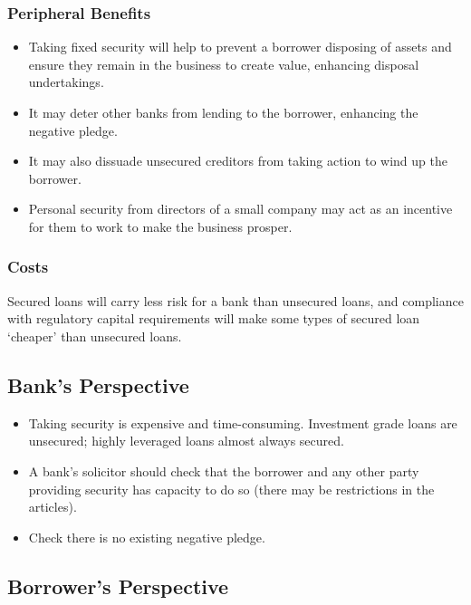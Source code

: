 \documentclass[
]{article}
\providecommand{\tightlist}{%
  \setlength{\itemsep}{0pt}\setlength{\parskip}{0pt}}
\begin{document}
\hypertarget{peripheral-benefits}{%
\subsubsection{Peripheral Benefits}\label{peripheral-benefits}}

\begin{itemize}
\tightlist
\item
  Taking fixed security will help to prevent a borrower disposing of
  assets and ensure they remain in the business to create value,
  enhancing disposal undertakings.
\item
  It may deter other banks from lending to the borrower, enhancing the
  negative pledge.
\item
  It may also dissuade unsecured creditors from taking action to wind up
  the borrower.
\item
  Personal security from directors of a small company may act as an
  incentive for them to work to make the business prosper.
\end{itemize}

\hypertarget{costs}{%
\subsubsection{Costs}\label{costs}}

Secured loans will carry less risk for a bank than unsecured loans, and
compliance with regulatory capital requirements will make some types of
secured loan `cheaper' than unsecured loans.

\hypertarget{banks-perspective}{%
\subsection{Bank's Perspective}\label{banks-perspective}}

\begin{itemize}
\tightlist
\item
  Taking security is expensive and time-consuming. Investment grade
  loans are unsecured; highly leveraged loans almost always secured.
\item
  A bank's solicitor should check that the borrower and any other party
  providing security has capacity to do so (there may be restrictions in
  the articles).
\item
  Check there is no existing negative pledge.
\end{itemize}

\hypertarget{borrowers-perspective}{%
\subsection{Borrower's Perspective}\label{borrowers-perspective}}
\end{document}
